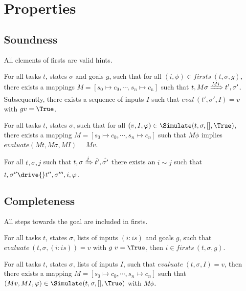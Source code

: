 
\section{Properties}
\label{sec:properties}

\subsection{Soundness}

All elements of firsts are valid hints.

\begin{lemma}
  \label{lem:soundfirsts}

  For all tasks $t$, states $\sigma$ and goals $g$,
  such that for all $(i,\phi)\in firsts\ (t,\sigma,g)$,
  there exists a mappings $M = [s_0\mapsto c_0,\cdots,s_n\mapsto c_n]$
  such that $t,M \sigma \xRightarrow[]{M i} t',\sigma'$.
  Subsequently, there exists a sequence of inputs $I$ such that $eval\ (t',\sigma',I) = v$
  with $g v = \True$.
\end{lemma}

\begin{lemma}
  \label{lem:soundsimulate}

  For all tasks $t$, states $\sigma$,
  such that for all $(v,I,\phi)\in \Simulate (t,\sigma,[],\True)$,
  there exists a mapping $M = [s_0\mapsto c_0,\cdots,s_n\mapsto c_n]$
  such that $M\phi$ implies $evaluate (M t,M \sigma,M I) = M v$.
\end{lemma}

\begin{theorem}
  \label{thm:completeDrive}
  For all $t,\sigma,j$ such that $t,\sigma \xRightarrow[]{j} \hat{t'},\hat{\sigma'}$
  there exists an $i\sim j$ such that $t,\sigma''\drive{} t'',\sigma''',i,\phi$.
\end{theorem}

\subsection{Completeness}

All steps towards the goal are included in firsts.

\begin{lemma}
  \label{lem:completefirsts}

  For all tasks $t$, states $\sigma$, lists of inputs $(i:is)$ and goals $g$,
  such that $evaluate\ (t,\sigma,(i:is))=v$ with $g\ v =\True$,
  then $i\in firsts\ (t,\sigma,g)$.

\end{lemma}


\begin{lemma}
  \label{lem:completesimulate}
  For all tasks $t$, states $\sigma$, lists of inputs $I$,
  such that $evaluate\ (t,\sigma,I)=v$,
  then there exists a mapping $M = [s_0\mapsto c_0,\cdots,s_n\mapsto c_n]$
  such that $(M v,M I,\phi)\in\Simulate(t,\sigma,[],\True)$ with $M \phi$.
\end{lemma}
